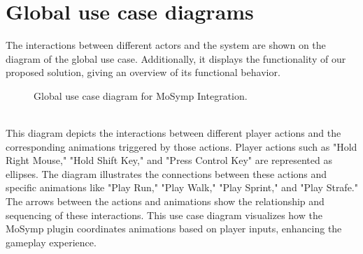 \documentclass[12pt]{book}
\begin{document}
\section{Global use case diagrams}
The interactions between different actors and the system are shown on the diagram of the global use case. Additionally, it displays the functionality of our proposed solution, giving an overview of its functional behavior. 
\newline 
\begin{figure}[!h]
    \centering
    \caption{Global use case diagram for MoSymp Integration.}
\end{figure}\\
This diagram depicts the interactions between different player actions and the corresponding animations triggered by those actions. Player actions such as "Hold Right Mouse," "Hold Shift Key," and "Press Control Key" are represented as ellipses. The diagram illustrates the connections between these actions and specific animations like "Play Run," "Play Walk," "Play Sprint," and "Play Strafe." The arrows between the actions and animations show the relationship and sequencing of these interactions. This use case diagram visualizes how the MoSymp plugin coordinates animations based on player inputs, enhancing the gameplay experience.
\end{document}
